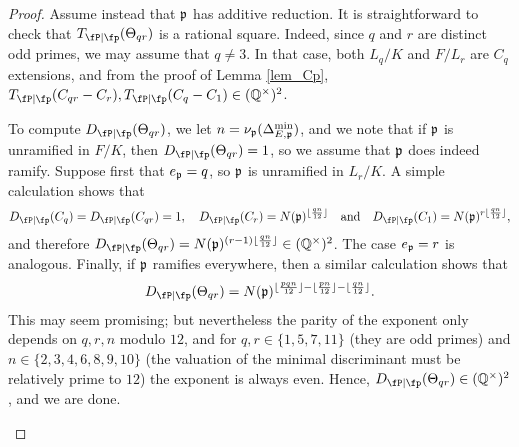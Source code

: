 \begin{proof}
    Assume instead that $\mathfrak{p}$ has additive reduction. It is straightforward to check that $\Tp(\Theta_{qr})$ is a rational square. Indeed, since $q$ and $r$ are distinct odd primes, we may assume that $q\neq 3$. In that case, both $L_q/K$ and $F/L_r$ are $C_q$ extensions, and from the proof of Lemma \ref{lem_Cp}, $\Tp(C_{qr}-C_r),\Tp(C_{q}-C_1)\in\QQss$.
    
    To compute $\Dp(\Theta_{qr})$, 
    we let $n=\nu_{\mathfrak{p}}(\Delta_{E,\mathfrak{p}}^{\min})$, and we note that 
    if $\mathfrak{p}$ is unramified in $F/K$, then $\Dp(\Theta_{qr})=1$, so we assume that $\mathfrak{p}$ does indeed ramify. Suppose first that $e_{\mathfrak{p}}=q$, so $\mathfrak{p}$ is unramified in $L_r/K$. A simple calculation shows that $$\Dp(C_{q})=\Dp(C_{qr})=1,\quad \Dp(C_r)=N(\pp)^{\floor{\frac{qn}{12}}}\quad\text{and}\quad \Dp(C_1)=N(\pp)^{r\floor{\frac{qn}{12}}},$$ and therefore $\Dp(\Theta_{qr})=N(\pp)^{(r-1)\floor{\frac{qn}{12}}}\in\QQss$. The case $e_{\mathfrak{p}}=r$ is analogous. Finally, if $\mathfrak{p}$ ramifies everywhere, then a similar calculation shows that 
    $$\Dp(\Theta_{qr})=N(\pp)^{\floor{\frac{pqn}{12}}-\floor{\frac{pn}{12}}-\floor{\frac{qn}{12}}}.$$
    This may seem promising; but nevertheless the parity of the exponent only depends on $q,r,n$ modulo $12$, and for $q,r\in\{1,5,7,11\}$ (they are odd primes) and $n\in\{2,3,4,6,8,9,10\}$ (the valuation of the minimal discriminant must be relatively prime to $12$) the exponent is always even. Hence, $\Dp(\Theta_{qr})\in\QQss$, and we are done. 

    \begin{figure}[!ht]
        \centering
\end{figure}
\end{proof}
